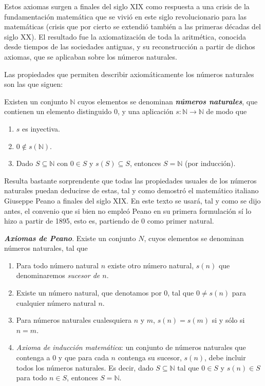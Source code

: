 \documentclass[12pt]{article}
\begin{document}
Estos axiomas surgen a finales del siglo XIX como respuesta a una crisis de la fundamentación matemática que se vivió en este siglo revolucionario para las matemáticas (crisis que por cierto se extendió también a las primeras décadas del siglo XX). El resultado fue la axiomatización de toda la aritmética, conocida desde tiempos de las sociedades antiguas, y su reconstrucción a partir de dichos axiomas, que se aplicaban sobre los números naturales.

Las propiedades que permiten describir axiomáticamente los números naturales son las que siguen: 

Existen un conjunto $\mathbb{N}$ cuyos elementos se denominan \textbf{\textit{números naturales}}, que contienen un elemento distinguido $0$, y una aplicación $s \colon \mathbb{N} \longrightarrow \mathbb{N}$ de modo que 
\begin{enumerate}
\item $s$ es inyectiva.
\item $0 \notin s(\mathbb{N})$.
\item Dado $S \subseteq \mathbb{N}$ con $0 \in S$ y $s(S) \subseteq S$, entonces $S = \mathbb{N}$ (por inducción).
\end{enumerate}

Resulta bastante sorprendente que todas las propiedades usuales de los números naturales puedan deducirse de estas, tal y como demostró el matemático italiano Giuseppe Peano a finales del siglo XIX. En este texto se usará, tal y como se dijo antes, el convenio que si bien no empleó Peano en su primera formulación sí lo hizo a partir de 1895, esto es, partiendo de $0$ como primer natural. 

\textbf{\textit{Axiomas de Peano}}. Existe un conjunto $N$, cuyos elementos se denominan números naturales, tal que
\renewcommand{\theenumi}{\Roman{enumi}} %
\begin{enumerate}
\item Para todo número natural $n$ existe otro número natural, $s(n)$ que denominaremos \textit{sucesor de $n$}.
\item Existe un número natural, que denotamos por $0$, tal que $0 \neq s(n)$ para cualquier número natural $n$.
\item Para números naturales cualesquiera $n$ y $m$, $s(n) = s(m)$ si y sólo si $n=m$.
\item \textit{Axioma de inducción matemática}: un conjunto de números naturales que contenga a $0$ y que para cada $n$ contenga su sucesor, $s(n)$, debe incluir todos los números naturales. Es decir, dado $S \subseteq \mathbb{N}$ tal que $0 \in S$ y $s(n) \in S$ para todo $n \in S$, entonces $S = \mathbb{N}.$
\end{enumerate}
\end{document}
